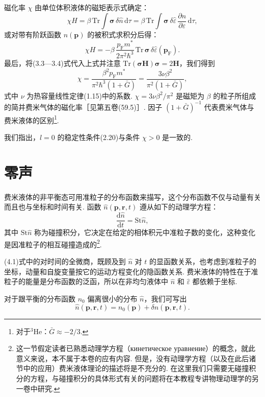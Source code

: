 磁化率 $\chi$ 由单位体积液体的磁矩表示式确定：
\begin{equation*}
\chi H=\beta\,\mathrm{Tr}\int\bm\sigma\,\delta\hat n\,\mathrm{d}\tau
=\beta\,\mathrm{Tr}\int\bm\sigma\,\delta\hat\varepsilon\,\frac{\partial n}{\partial\varepsilon}\,\mathrm{d}\tau,
\end{equation*}
或对带有阶跃函数 $n(\bm p)$ 的被积式求积分后得：
\begin{equation*}
\chi H=-\beta\,\frac{p_{\mathrm F}m^{*}}{2\pi^{2}\hbar^{3}}\,\mathrm{Tr}\,\bm\sigma\,\delta\hat\varepsilon(\bm p_{\mathrm F}).
\end{equation*}
最后，将(3.3—3.4)式代入上式并注意 $\mathrm{Tr}(\bm\sigma\bm H)\bm\sigma=2\bm H$，我们得到
\begin{equation}
\chi=\frac{\beta^{2}p_{\mathrm F}m^{*}}{\pi^{2}\hbar^{3}(1+\bar G)}=\frac{3\nu\beta^{2}}{\pi^{2}(1+\bar G)},
\end{equation}
式中 $\nu$ 为热容量线性定律(1.15)中的系数. $\chi=3\nu\beta^{2}/\pi^{2}$ 是磁矩为 $\beta$ 的粒子所组成的简并费米气体的磁化率［见第五卷(59.5)］. 因子 $(1+\bar G)^{-1}$ 代表费米气体与费米液体的区别\footnote{对于$^{3}$He：$\bar G\approx-2/3$.}.

我们指出，$l=0$ 的稳定性条件(2.20)与条件 $\chi>0$ 是一致的.

\section{零声}

费米液体的非平衡态可用准粒子的分布函数来描写，这个分布函数不仅与动量有关而且也与坐标和时间有关. 函数 $\hat n(\bm p,\bm r,t)$ 遵从如下的动理学方程：
\begin{equation}
\frac{\mathrm{d}\hat n}{\mathrm{d}t}=\mathrm{St}\hat n,
\end{equation}
其中 $\mathrm{St}\hat n$ 称为碰撞积分，它决定在给定的相体积元中准粒子数的变化，这种变化是因准粒子的相互碰撞造成的\footnote{这一节假定读者已熟悉动理学方程（кинетическое уравнение）的概念，就此意义来说，本不属于本卷的应有内容. 但是，没有动理学方程（以及在此后诸节中的应用）费米液体理论的描述将是不充分的. 在这里我们只需要无碰撞积分的方程，与碰撞积分的具体形式有关的问题将在本教程专讲物理动理学的另一卷中研究.}.

(4.1)式中的对时间的全微商，既顾及到 $\hat n$ 对 $t$ 的显函数关系，也考虑到准粒子的坐标，动量和自旋变量按它的运动方程变化的隐函数关系. 费米液体的特性在于准粒子的能量是分布函数的泛函，所以在非均匀液体中 $\hat n$ 和 $\hat\varepsilon$ 都依赖于坐标.

对于跟平衡的分布函数 $n_{0}$ 偏离很小的分布 $\hat n$，我们可写出
\begin{equation}
\hat n(\bm p,\bm r,t)=n_{0}(\bm p)+\delta\hat n(\bm p,\bm r,t).
\end{equation}

